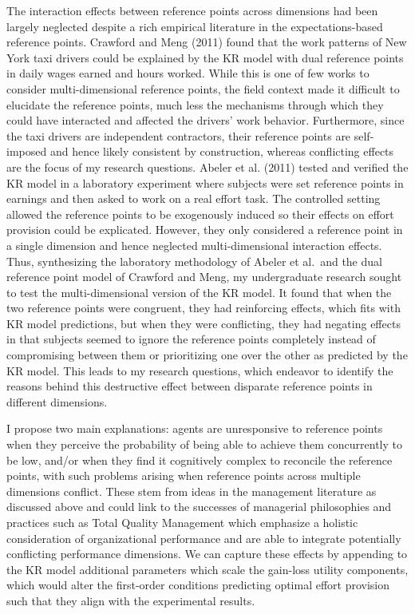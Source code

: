 \documentclass[
  12,
  letterpaper,
  DIV=11,
  numbers=noendperiod]{scrartcl}
\begin{document}
The interaction effects between reference points across dimensions had
been largely neglected despite a rich empirical literature in the
expectations-based reference points. Crawford and Meng (2011) found that
the work patterns of New York taxi drivers could be explained by the KR
model with dual reference points in daily wages earned and hours worked.
While this is one of few works to consider multi-dimensional reference
points, the field context made it difficult to elucidate the reference
points, much less the mechanisms through which they could have
interacted and affected the drivers' work behavior. Furthermore, since
the taxi drivers are independent contractors, their reference points are
self-imposed and hence likely consistent by construction, whereas
conflicting effects are the focus of my research questions. Abeler et
al. (2011) tested and verified the KR model in a laboratory experiment
where subjects were set reference points in earnings and then asked to
work on a real effort task. The controlled setting allowed the reference
points to be exogenously induced so their effects on effort provision
could be explicated. However, they only considered a reference point in
a single dimension and hence neglected multi-dimensional interaction
effects. Thus, synthesizing the laboratory methodology of Abeler et
al.~and the dual reference point model of Crawford and Meng, my
undergraduate research sought to test the multi-dimensional version of
the KR model. It found that when the two reference points were
congruent, they had reinforcing effects, which fits with KR model
predictions, but when they were conflicting, they had negating effects
in that subjects seemed to ignore the reference points completely
instead of compromising between them or prioritizing one over the other
as predicted by the KR model. This leads to my research questions, which
endeavor to identify the reasons behind this destructive effect between
disparate reference points in different dimensions.

I propose two main explanations: agents are unresponsive to reference
points when they perceive the probability of being able to achieve them
concurrently to be low, and/or when they find it cognitively complex to
reconcile the reference points, with such problems arising when
reference points across multiple dimensions conflict. These stem from
ideas in the management literature as discussed above and could link to
the successes of managerial philosophies and practices such as Total
Quality Management which emphasize a holistic consideration of
organizational performance and are able to integrate potentially
conflicting performance dimensions. We can capture these effects by
appending to the KR model additional parameters which scale the
gain-loss utility components, which would alter the first-order
conditions predicting optimal effort provision such that they align with
the experimental results.
\end{document}
